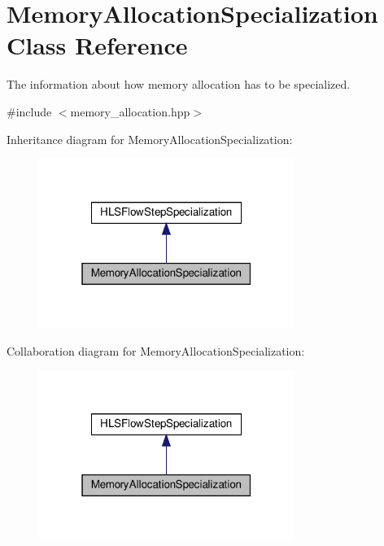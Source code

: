\hypertarget{classMemoryAllocationSpecialization}{}\section{Memory\+Allocation\+Specialization Class Reference}
\label{classMemoryAllocationSpecialization}


The information about how memory allocation has to be specialized.  




{\ttfamily \#include $<$memory\+\_\+allocation.\+hpp$>$}



Inheritance diagram for Memory\+Allocation\+Specialization\+:
\nopagebreak
\begin{figure}[H]
\begin{center}
\leavevmode
\includegraphics[width=235pt]{d9/def/classMemoryAllocationSpecialization__inherit__graph}
\end{center}
\end{figure}


Collaboration diagram for Memory\+Allocation\+Specialization\+:
\nopagebreak
\begin{figure}[H]
\begin{center}
\leavevmode
\includegraphics[width=235pt]{d1/d9f/classMemoryAllocationSpecialization__coll__graph}
\end{center}
\end{figure}
